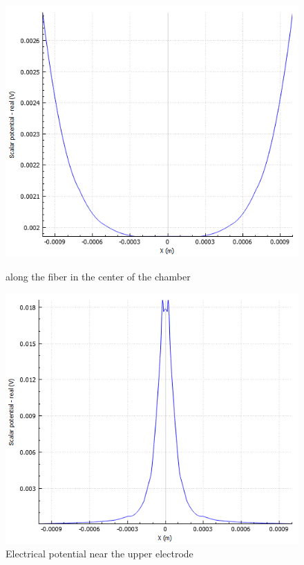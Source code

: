 \documentclass{article}
\begin{document}
    \begin{figure}[htbp]
        \centering
        \begin{minipage}[b]{0.49\textwidth}
            \includegraphics[width=\textwidth]{FE_efield_along_fiber_1}
            \caption{ along the fiber in the center of the chamber}
            \label{fig:FE_efield_along_fiber_1}
        \end{minipage}
        \hfill
        \begin{minipage}[b]{0.49\textwidth}
            \includegraphics[width=\textwidth]{FE_efield_at_electrode_1}
            \caption{Electrical potential near the upper electrode}
            \label{fig:FE_efield_at_electrode_1}
        \end{minipage}
    \end{figure}
\end{document}
